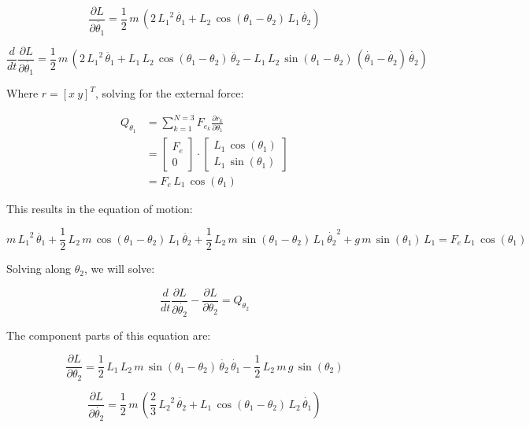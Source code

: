 \documentclass[12pt, letterpaper]{../assignment}
\begin{document}
$$ \frac{\partial L}{\partial \dot{\theta_1}}  =
\frac{1}{2}\,m\,{\left(2\,{L_1 }^2 \,\dot{\theta_1} +L_2 \,\cos \left(\theta_1 -\theta_2 \right)\,L_1 \,\dot{\theta_2} \right)} $$

$$ \frac{d}{d t} \frac{\partial L}{\partial \dot{\theta_1}} =
\frac{1}{2}\,m\,{\left(2\,{L_1 }^2 \,\ddot{\theta_1} +L_1 \,L_2 \,\cos \left(\theta_1 -\theta_2 \right)\,\ddot{\theta_2} -L_1 \,L_2 \,\sin \left(\theta_1 -\theta_2 \right)\,{\left(\dot{\theta_1} -\dot{\theta_2} \right)}\,\dot{\theta_2} \right)} $$

Where $r = [ x \ y]^T$, solving for the external force:

\begin{equation*}
    \begin{aligned}
    Q_{\theta_1} &= \sum_{k=1}^{N=3} F_{e_k} \frac{\partial r_k }{\partial {\theta_1}}\\
    &=\left[\begin{array}{c} F_{e}\\ 0 \end{array}\right] \cdot \left[\begin{array}{c} L_{1}\,\cos\left(\theta _{1}\right)\\ L_{1}\,\sin\left(\theta _{1}\right) \end{array}\right]\\
    &= F_e \,L_1 \,\cos \left(\theta_1\right)
    \end{aligned}
\end{equation*}

This results in the equation of motion:

$$ m\,{L_1 }^2 \,\ddot{\theta_1} +\frac{1}{2}\,L_2 \,m\,\cos \left(\theta_1 -\theta_2 \right)\,L_1 \,\ddot{\theta_2} +\frac{1}{2}\,L_2 \,m\,\sin \left(\theta_1 -\theta_2 \right)\,L_1 \,{{\dot{\theta_2}}}^2 +g\,m\,\sin \left(\theta_1 \right)\,L_1  = F_e \,L_1 \,\cos \left(\theta_1\right) $$

Solving along $\theta_2$, we will solve:

$$ \frac{d}{d t} \frac{\partial L}{\partial \dot{\theta_2}} - \frac{\partial L}{\partial \theta_2} =  Q_{\theta_2} $$

The component parts of this equation are:

$$ \frac{\partial L}{\partial \theta_2} = 
\frac{1}{2}\,L_1 \,L_2 \,m\,\sin \left(\theta_1 -\theta_2 \right)\,\dot{\theta_2} \,\dot{\theta_1} -\frac{1}{2}\,L_2 \,m\,g\,\sin \left(\theta_2 \right) $$

$$ \frac{\partial L}{\partial \dot{\theta_2}}  =
\frac{1}{2}\,m\,{\left(\frac{2}{3}\,{L_2 }^2 \,\dot{\theta_2} +L_1 \,\cos \left(\theta_1 -\theta_2 \right)\,L_2 \,\dot{\theta_1} \right)} $$
\end{document}
